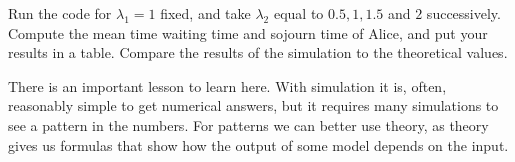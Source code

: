 \documentclass[assignments]{subfiles}
\begin{document}
\begin{exercise}
Run the code for $\lambda_{1}=1$ fixed, and take $\lambda_{2}$ equal to $0.5, 1, 1.5$ and $2$ successively. Compute the mean time waiting time and  sojourn time of Alice, and put your results in a table. Compare the results of the simulation to the theoretical values.
\begin{solution}
\end{solution}
\end{exercise}

There is an important lesson to learn here.
With simulation it is, often, reasonably simple to get numerical answers, but it requires many simulations to see a pattern in the numbers.
For patterns we can better use theory, as theory gives us formulas that show how the output of some model depends on the input.
\end{document}
